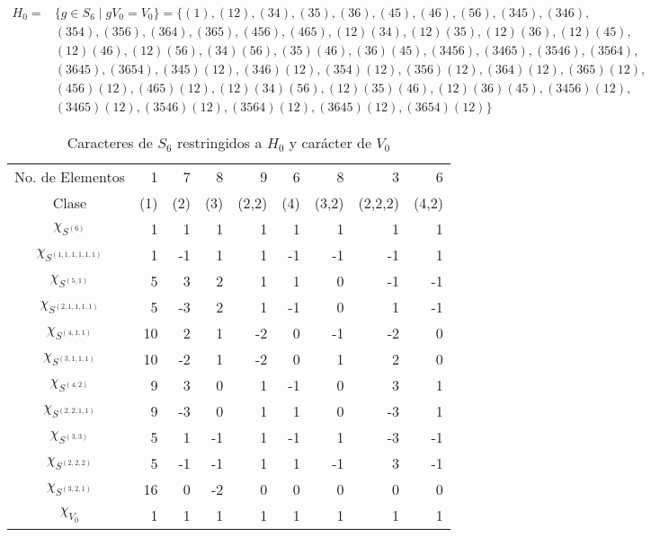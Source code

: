 \documentclass[12pt]{book}
\theoremstyle{definition}
\newcounter{in}
\begin{document}
  \begin{footnotesize}
    \begin{align*}
      H_{0}=&\{g\in S_{6}\mid
      gV_{0}=V_{0}\}=\{(1),(12),(34),(35),(36),(45),(46),(56),(345),(346),\\
      &(354),(356),(364),(365),(456),(465),(12)(34),(12)(35),(12)(36),(12)(45),\\
      &(12)(46),(12)(56),(34)(56),(35)(46),(36)(45),(3456),(3465),(3546),(3564),\\
      &(3645),(3654),(345)(12),(346)(12),(354)(12),(356)(12),(364)(12),(365)(12),\\
      &(456)(12),(465)(12),(12)(34)(56),(12)(35)(46),(12)(36)(45),(3456)(12),\\
      &(3465)(12),(3546)(12),(3564)(12),(3645)(12),(3654)(12)\}
    \end{align*}
  \end{footnotesize}

 \begin{table}[!hbtp]
    \centering
    \begin{tabular}{c |r r r r r r r r}
      No. de Elementos  & 1 & 7 & 8 & 9 & 6 & 8 & 3 & 6  \\
      Clase&(1)& (2) & (3) & (2,2) & (4)& (3,2) & (2,2,2) & (4,2)\\
      \hline
      $\chi_{S^{{(6)}}}$         & 1 & 1  & 1  & 1 & 1 & 1 & 1 & 1 \\
      $\chi_{S^{{(1,1,1,1,1,1)}}}$ & 1 & -1 & 1  & 1 & -1&-1 &-1 & 1 \\
      $\chi_{S^{{(5,1)}}}$       & 5 & 3  & 2  & 1 & 1 & 0 &-1 &-1 \\
      $\chi_{S^{{(2,1,1,1,1)}}}$  & 5 & -3 &  2 & 1 &-1 & 0 & 1 &-1  \\
      $\chi_{S^{{(4,1,1)}}}$     & 10& 2  & 1  & -2& 0 &-1 &-2 & 0  \\
      $\chi_{S^{{(3,1,1,1)}}}$    & 10&-2  & 1  &-2 & 0 & 1 & 2 & 0 \\
      $\chi_{S^{{(4,2)}}}$       & 9 & 3  & 0  & 1 & -1& 0 & 3 & 1 \\
      $\chi_{S^{{(2,2,1,1)}}}$    & 9 & -3 & 0  & 1 & 1 & 0 &-3 & 1 \\
      $\chi_{S^{{(3,3)}}}$       & 5 & 1  & -1  & 1 &-1 &1 & -3& -1 \\
      $\chi_{S^{{(2,2,2)}}}$     & 5  & -1& -1  & 1 & 1 & -1& 3 & -1 \\
      $\chi_{S^{{(3,2,1)}}}$     & 16 & 0 & -2  & 0 & 0 & 0 & 0 & 0 \\
      \hline
      $\chi_{V_{0}}$        & 1 & 1 & 1 & 1 & 1 & 1 &1 & 1  \\
    \end{tabular}

    \caption{Caracteres de $S_{6}$ restringidos a $H_{0}$ y carácter de $V_{0}$}
    \label{tab:restriccion-H_0-M-6}
  \end{table}
\end{document}
